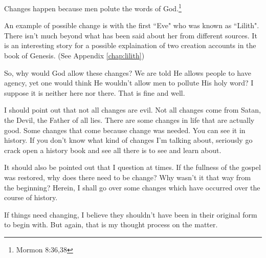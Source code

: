 Changes happen because men polute the words of God.\footnote{Mormon 8:36,38}

An example of possible change is with the first ``Eve" who was known as
``Lilith". There isn't much beyond what has been said about her from different
sources. It is an interesting story for a possible explaination of two
creation accounts in the book of Genesis. (See Appendix \ref{chap:lilith})

So, why would God allow these changes? We are told He allows people to have
agency, yet one would think He wouldn't allow men to pollute His holy word?
I suppose it is neither here nor there. That is fine and well.

I should point out that not all changes are evil. Not all changes come from 
Satan, the Devil, the Father of all lies. There are some changes in life that 
are actually good. Some changes that come because change was needed. You can see 
it in history. If you don't know what kind of changes I'm talking about, 
seriously go crack open a history book and see all there is to see and learn 
about.

It should also be pointed out that I question at times. If the fullness of the 
gospel was restored, why does there need to be change? Why wasn't it that way 
from the beginning? Herein, I shall go over some changes which have occurred
over the course of history.

If things need changing, I believe they shouldn't have been in their original
form to begin with. But again, that is my thought process on the matter.